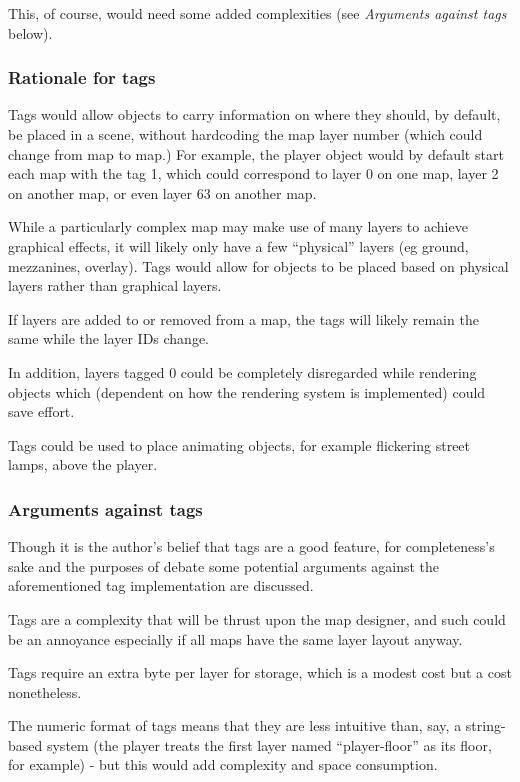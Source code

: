 \documentclass [12pt,a4paper]{article}
\begin{document}
This, of course, would need some added complexities (see
\emph{Arguments against tags} below).

\subsubsection{Rationale for tags}

Tags would allow objects to carry information on where they should, by
default, be placed in a scene, without hardcoding the map layer number
(which could change from map to map.)  For example, the player object
would by default start each map with the tag 1, which could correspond
to layer 0 on one map, layer 2 on another map, or even layer 63 on
another map.

While a particularly complex map may make use of many layers to
achieve graphical effects, it will likely only have a few ``physical''
layers (eg ground, mezzanines, overlay).  Tags would allow for objects
to be placed based on physical layers rather than graphical layers.

If layers are added to or removed from a map, the tags will likely
remain the same while the layer IDs change.

In addition, layers tagged 0 could be completely disregarded while
rendering objects which (dependent on how the rendering system is
implemented) could save effort.

Tags could be used to place animating objects, for example flickering
street lamps, above the player.

\subsubsection{Arguments against tags}

Though it is the author's belief that tags are a good feature, for
completeness's sake and the purposes of debate some potential
arguments against the aforementioned tag implementation are discussed.

Tags are a complexity that will be thrust upon the map designer, and
such could be an annoyance especially if all maps have the same layer
layout anyway.

Tags require an extra byte per layer for storage, which is a modest
cost but a cost nonetheless.

The numeric format of tags means that they are less intuitive than,
say, a string-based system (the player treats the first layer named
``player-floor'' as its floor, for example) - but this would add
complexity and space consumption.
\end{document}
